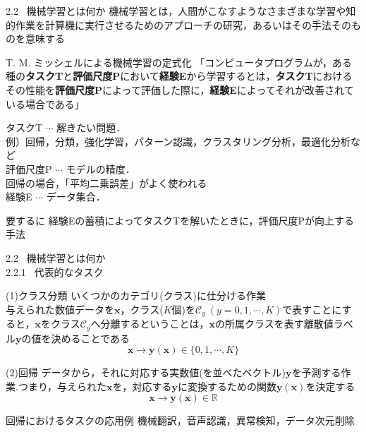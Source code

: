 \documentclass[dvipdfmx,8pt]{beamer}
\begin{document}
  \begin{frame}{2.2 \ 機械学習とは何か}
    機械学習とは，人間がこなすようなさまざまな学習や知的作業を計算機に実行させるためのアプローチの研究，あるいはその手法そのものを意味する
    \begin{block}{T. M. ミッシェルによる機械学習の定式化}
      「コンピュータプログラムが，ある種の\textbf{タスクT}と\textbf{評価尺度P}において\textbf{経験E}から学習するとは，\textbf{タスクT}におけるその性能を\textbf{評価尺度P}によって評価した際に，\textbf{経験E}によってそれが改善されている場合である」
    \end{block}
    タスクT $\cdots$ 解きたい問題．\\
    \hspace{1.7cm}例）回帰，分類，強化学習，パターン認識，クラスタリング分析，最適化分析など\\
    評価尺度P $\cdots$ モデルの精度．\\
    \hspace{2cm}回帰の場合，「平均二乗誤差」がよく使われる\\
    経験E $\cdots$ データ集合．\\
    \begin{itembox}[l]{要するに}
    経験Eの蓄積によってタスクTを解いたときに，評価尺度Pが向上する手法
    \end{itembox}
  \end{frame}

  \begin{frame}{2.2 \ 機械学習とは何か \\ \normalsize{2.2.1 \ 代表的なタスク}}
    \begin{block}{(1)クラス分類}
      いくつかのカテゴリ(クラス)に仕分ける作業\\
      与えられた数値データを$\bm{x}$，クラス($K$個)を$\mathcal{C}_y \ (y = 0,1,\cdots,K)$で表すことにすると，$\bm{x}$をクラス$\mathcal{C}_y$へ分離するということは，$\bm{x}$の所属クラスを表す離散値ラベル$\bm{y}$の値を決めることである
      \begin{equation*}
        \bm{x} \rightarrow \bm{y}(\bm{x}) \in \{0 , 1 , \cdots , K\}
      \end{equation*}
    \end{block}
    \begin{block}{(2)回帰}
      データから，それに対応する実数値(を並べたベクトル)$\bm{y}$を予測する作業.つまり，与えられた$\bm{x}$を，対応する$\bm{y}$に変換するための関数$\bm{y}(\bm{x})$を決定する
      \begin{equation*}
        \bm{x} \rightarrow \bm{y}(\bm{x}) \in \mathbb{R}
      \end{equation*} 
    \end{block}
       
    \begin{exampleblock}{回帰におけるタスクの応用例}
      機械翻訳，音声認識，異常検知，データ次元削除
    \end{exampleblock}
  \end{frame}
\end{document}
